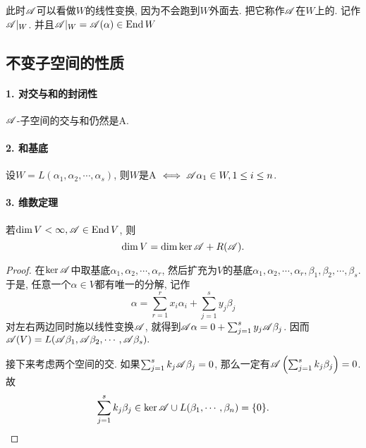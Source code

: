 \documentclass{ctexart}
\begin{document}
此时${\mathscr A}$可以看做$W$的线性变换, 因为不会跑到$W$外面去. 把它称作${\mathscr A}$在$W$上的. 记作${\mathscr A} |_W$. 并且${\mathscr A} |_W={\mathscr A} (\alpha)\in \operatorname{End} W$

\subsection{不变子空间的性质}

\paragraph{1. 对交与和的封闭性}  ${\mathscr A}$-子空间的交与和仍然是\zkj A. 

\paragraph{2. 和基底} 设$W=L(\alpha_1,\alpha_2, \cdots, \alpha_s)$, 则$W$是\zkj A $\iff {\mathscr A} \alpha_1\in W,1\leq i\leq n$.

\paragraph{3. 维数定理} 若$\dim V< \infty, {\mathscr A}\in \operatorname{End} V$, 则
\[
    \dim V = \dim \ker {\mathscr A} + R({\mathscr A}).
\]
\begin{proof}
    在$\ker {\mathscr A}$中取基底$\alpha_1, \alpha_2, \cdots, \alpha_r$, 然后扩充为$V$的基底$\alpha_1, \alpha_2, \cdots, \alpha_r,\beta_1,\beta_2,\cdots, \beta_s$. 于是, 任意一个$\alpha\in V$都有唯一的分解, 记作
    \[
        \alpha=\sum_{r=1}^{r}x_i\alpha_i+\sum_{j=1}^{s}y_j\beta_j
    \]
    对左右两边同时施以线性变换${\mathscr A}$, 就得到${\mathscr A}\alpha=0+\sum_{j=1}^{s}y_j{\mathscr A}\beta_j$. 因而${\mathscr A} (V)=L({\mathscr A}\beta_1, {\mathscr A}\beta_2,\cdots, {\mathscr A}\beta_s).$ 

    接下来考虑两个空间的交. 如果$\sum_{j=1}^{s}k_j{\mathscr A}\beta_j=0$, 那么一定有${\mathscr A}\left(\sum_{j=1}^{s}k_j\beta_j\right)=0$. 故
    \[
        \sum_{j=1}^{s}k_j\beta_j\in \ker {\mathscr A} \cup L(\beta_1, \cdots, \beta_n)=\{0\}.
    \]
\end{proof}
\end{document}
